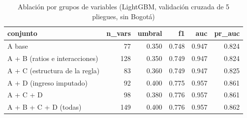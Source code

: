 \begin{table}[ht]
\centering
\begin{tabular}{lrrrrr}
  \hline
conjunto & n\_vars & umbral & f1 & auc & pr\_auc \\ 
  \hline
A base &   77 & 0.350 & 0.748 & 0.947 & 0.824 \\ 
  A + B (ratios e interacciones) &  128 & 0.350 & 0.749 & 0.947 & 0.824 \\ 
  A + C (estructura de la regla) &   83 & 0.360 & 0.749 & 0.947 & 0.825 \\ 
  A + D (ingreso imputado) &   92 & 0.400 & 0.775 & 0.957 & 0.861 \\ 
  A + C + D &   98 & 0.380 & 0.776 & 0.957 & 0.861 \\ 
  A + B + C + D (todas) &  149 & 0.400 & 0.776 & 0.957 & 0.862 \\ 
   \hline
\end{tabular}
\caption{Ablación por grupos de variables (LightGBM, validación cruzada de 5 pliegues, sin Bogotá)} 
\end{table}

